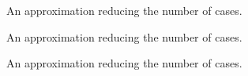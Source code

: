\begin{figure}[h]
\center
{}
\caption{An approximation reducing the number of cases.}
\label{steplin} 
\end{figure}

\begin{figure}[h]
\center
{}
\caption{An approximation reducing the number of cases.}
\label{steplin} 
\end{figure}

\begin{figure}[h]
\center
{}
\caption{An approximation reducing the number of cases.}
\label{steplin} 
\end{figure}